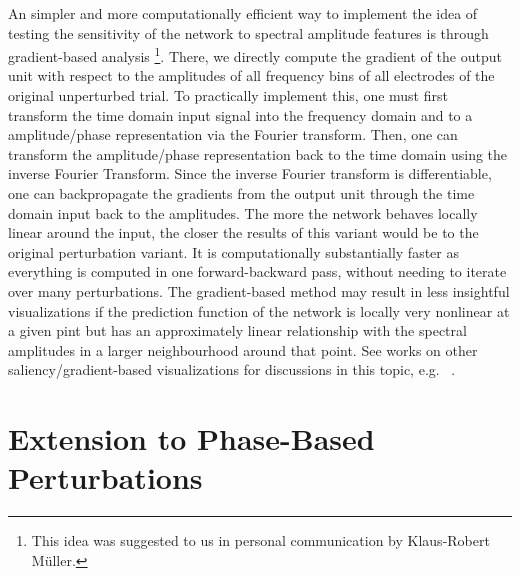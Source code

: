     An simpler and more computationally efficient way to implement the idea
of testing the sensitivity of the network to spectral amplitude features
is through gradient-based analysis \footnote{This idea was suggested to
  us in personal communication by Klaus-Robert Müller.}. There, we
directly compute the gradient of the output unit with respect to the
amplitudes of all frequency bins of all electrodes of the original
unperturbed trial. To practically implement this, one must first
transform the time domain input signal into the frequency domain and to
a amplitude/phase representation via the Fourier transform. Then, one
can transform the amplitude/phase representation back to the time domain
using the inverse Fourier Transform. Since the inverse Fourier transform
is differentiable, one can backpropagate the gradients from the output
unit through the time domain input back to the amplitudes. The more the
network behaves locally linear around the input, the closer the results
of this variant would be to the original perturbation variant. It is
computationally substantially faster as everything is computed in one
forward-backward pass, without needing to iterate over many
perturbations. The gradient-based method may result in less insightful
visualizations if the prediction function of the network is locally very
nonlinear at a given pint but has an approximately linear relationship
with the spectral amplitudes in a larger neighbourhood around that
point. See works on other saliency/gradient-based visualizations for
discussions in this topic,
e.g. ~\citet{sturmfels2020visualizing}.


\section{Extension to Phase-Based
Perturbations}\label{extension-to-phase-based-perturbations}

